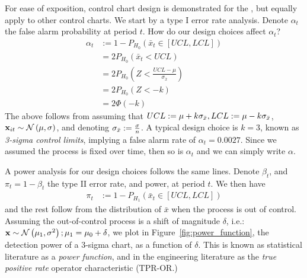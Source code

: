 For ease of exposition, control chart design is demonstrated for the \barxChart, but equally apply to other control charts.
We start by a type I error rate analysis. 
Denote $\alpha_t$ the false alarm probability at period $t$.
How do our design choices affect $\alpha_t$?
\begin{align}
	\alpha_t &:= 1-P_{H_0}(\bar{x}_t \in [UCL,LCL]) \\
	&= 2 P_{H_0}(\bar{x}_t<UCL) \\
	&= 2 P_{H_0}(Z<\frac{UCL-\mu}{\sigma_{\bar{x}}}) \\
	&= 2 P_{H_0}(Z < -k) \\
	&= 2 \Phi(-k)
\end{align}
The above follows from assuming that $UCL:=\mu + k \sigma_{\bar{x}}, LCL:= \mu - k \sigma_{\bar{x}}$, $\mathbf{x}_{it}\sim \mathcal{N}\left(\mu,\sigma\right)$, and denoting $\sigma_{\bar{x}}:= \frac{\sigma}{n}$.
A typical design choice is $k=3$, known as \emph{3-sigma control limits}, implying a false alarm rate of $\alpha_t=0.0027$.
Since we assumed the process is fixed over time, then so is $\alpha_t$ and we can simply write $\alpha$.

A power analysis for our design choices follows the same lines.
Denote $\beta_t$, and $\pi_t=1-\beta_t$ the type II error rate, and power, at period $t$.
We then have
\begin{align}
	\pi_t &:= 1-P_{H_1}(\bar{x}_t \in [UCL,LCL])
\end{align}
and the rest follow from the distribution of $\bar{x}$ when the process is out of control.
Assuming the out-of-control process is a shift of magnitude $\delta$, i.e.: $\mathbf{x} \sim \mathcal{N}\left(\mu_1,\sigma^2\right); \mu_1=\mu_0+\delta$, we plot in Figure~\ref{fig:power_function}, the detection power of a 3-sigma chart, as a function of $\delta$. 
This is known as statistical literature as a \emph{power function}, and in the engineering literature as the \emph{true positive rate} operator characteristic (TPR-OR.)

